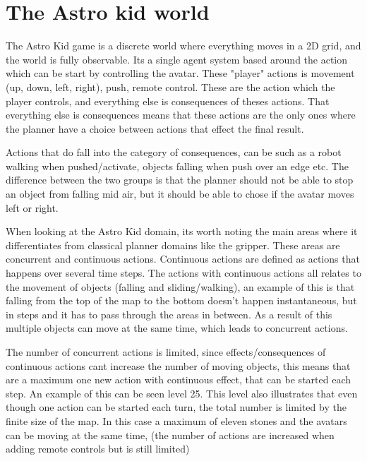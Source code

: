 	\section{The Astro kid world}
	The Astro Kid game is a discrete world where everything moves in a 2D grid, and the world is fully observable. Its a single agent system based around the action which can be start by controlling the avatar. These "player" actions is movement (up, down, left, right), push, remote control. These are the action which the player controls, and everything else is consequences of theses actions. That everything else is consequences means that these actions are the only ones where the planner have a choice between actions that effect the final result. 
	
	
	Actions that do fall into the category of consequences, can be such as a robot walking when pushed/activate, objects falling when push over an edge etc. The difference between the two groups is that the planner should not be able to stop an object from falling mid air, but it should be able to chose if the avatar moves left or right. 
	
	When looking at the Astro Kid domain, its worth noting the main areas where it differentiates from classical planner domains like the gripper. These areas are concurrent and continuous actions. Continuous actions are defined as actions that happens over several time steps. 
	The actions with continuous actions all relates to the movement of objects (falling and sliding/walking), an example of this is that falling from the top of the map to the bottom doesn't happen instantaneous, but in steps and it has to pass through the areas in between. As a result of this multiple objects can move at the same time, which leads to concurrent actions.
	
	The number of concurrent actions is limited, since effects/consequences of continuous actions cant increase the number of moving objects, this means that are a maximum one new action with continuous effect, that can be started each step. An example of this can be seen {\huge level 25}. This level also illustrates that even though one action can be started each turn, the total number is limited by the finite size of the map. In this case a maximum of eleven stones and the avatars can be moving at the same time, (the number of actions are increased when adding remote controls but is still limited)

